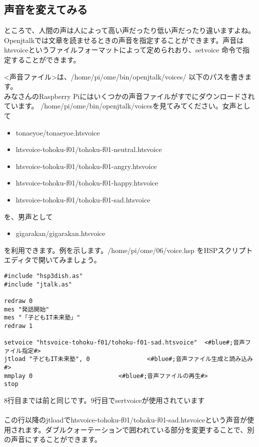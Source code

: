 \subsection{声音を変えてみる}
ところで、人間の声は人によって高い声だったり低い声だったり違いますよね。Openjtalkでは文章を読ませるときの声音を指定することができます。声音はhtsvoiceというファイルフォーマットによって定められおり、setvoice 命令で指定することができます。\\

<声音ファイル>は、/home/pi/ome/bin/openjtalk/voices/ 以下のパスを書きます。\\
みなさんのRaspberry Piにはいくつかの声音ファイルがすでにダウンロードされています。 /home/pi/ome/bin/openjtalk/voicesを見てみてください。女声として
\begin{itemize}
\item tonaeyoe/tonaeyoe.htsvoice
\item htsvoice-tohoku-f01/tohoku-f01-neutral.htsvoice
\item htsvoice-tohoku-f01/tohoku-f01-angry.htsvoice
\item htsvoice-tohoku-f01/tohoku-f01-happy.htsvoice
\item htsvoice-tohoku-f01/tohoku-f01-sad.htsvoice
\end{itemize}
を、男声として
\begin{itemize}
\item gigarakan/gigarakan.htsvoice
\end{itemize}
を利用できます。例を示します。/home/pi/ome/06/voice.hsp をHSPスクリプトエディタで開いてみましょう。\\

\begin{lstlisting}[caption=voice.hsp,label=voice.hsp]
#include "hsp3dish.as"
#include "jtalk.as"

redraw 0
mes "発話開始"
mes "「子どもIT未来塾」"
redraw 1

setvoice "htsvoice-tohoku-f01/tohoku-f01-sad.htsvoice"	<#blue#;音声ファイル指定#>
jtload "子どもIT未来塾", 0				<#blue#;音声ファイル生成と読み込み#>
mmplay 0						<#blue#;音声ファイルの再生#>
stop
\end{lstlisting}

8行目までは前と同じです。9行目でsertvoiceが使用されています\\
\\
この行以降のjtloadでhtsvoice-tohoku-f01/tohoku-f01-sad.htsvoiceという声音が使用されます。ダブルクォーテーションで囲われている部分を変更することで、別の声音にすることができます。\\

